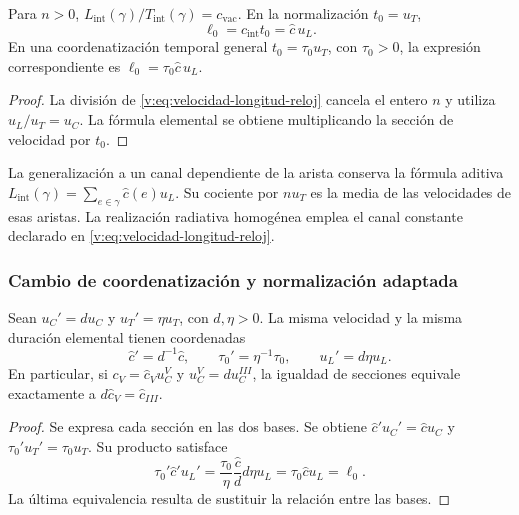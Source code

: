 \begin{corollary}
\label{v:cor:longitud-elemental-constitutiva}
Para $n>0$, $L_{\mathrm{int}}(\gamma)/T_{\mathrm{int}}(\gamma)
=c_{\mathrm{vac}}$. En la normalización $t_0=u_T$,
\begin{equation}
 \ell_0=c_{\mathrm{int}}t_0=\widehat c\,u_L.
 \label{v:eq:longitud-elemental-constitutiva}
\end{equation}
En una coordenatización temporal general $t_0=\tau_0u_T$, con $\tau_0>0$,
la expresión correspondiente es $\ell_0=\tau_0\widehat c\,u_L$.
\end{corollary}
\begin{proof}
La división de \eqref{v:eq:velocidad-longitud-reloj} cancela el entero
$n$ y utiliza $u_L/u_T=u_C$. La fórmula elemental se obtiene
multiplicando la sección de velocidad por $t_0$.
\end{proof}

La generalización a un canal dependiente de la arista conserva la fórmula
aditiva $L_{\mathrm{int}}(\gamma)=\sum_{e\in\gamma}\widehat c(e)u_L$.
Su cociente por $nu_T$ es la media de las velocidades de esas aristas.
La realización radiativa homogénea emplea el canal constante declarado
en \eqref{v:eq:velocidad-longitud-reloj}.

\subsubsection{Cambio de coordenatización y normalización adaptada}

\begin{proposition}
\label{v:prop:covariancia-identidad-velocidad}
Sean $u_C'=d u_C$ y $u_T'=\eta u_T$, con $d,\eta>0$.
La misma velocidad y la misma duración elemental tienen coordenadas
\begin{equation}
 \widehat c'=d^{-1}\widehat c,
 \qquad \tau_0'=\eta^{-1}\tau_0,
 \qquad u_L'=d\eta u_L.
 \label{v:eq:velocidad-cambio-carta}
\end{equation}
En particular, si $c_V=\widehat c_Vu_C^V$ y
$u_C^V=d u_C^{III}$, la igualdad de secciones equivale exactamente a
$d\widehat c_V=\widehat c_{III}$.
\end{proposition}
\begin{proof}
Se expresa cada sección en las dos bases. Se obtiene
$\widehat c'u_C'=\widehat c u_C$ y
$\tau_0'u_T'=\tau_0u_T$. Su producto satisface
\[
 \tau_0'\widehat c' u_L'
 =\frac{\tau_0}{\eta}\frac{\widehat c}{d}
       d\eta u_L
 =\tau_0\widehat c u_L=\ell_0.
\]
La última equivalencia resulta de sustituir la relación entre las bases.
\end{proof}

